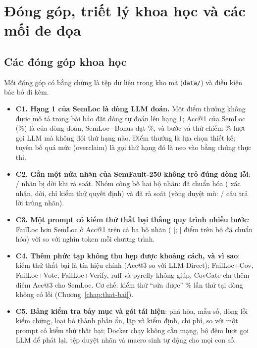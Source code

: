 \chapter{Đóng góp, triết lý khoa học và các mối đe dọa}
\label{chap:dong-gop}

\section{Các đóng góp khoa học}
\label{sec:dong-gop}

Mỗi đóng góp có bằng chứng là tệp dữ liệu trong kho mã (\texttt{data/}) và điều kiện bác bỏ đi kèm.
\begin{itemize}
\item \textbf{C1. Hạng 1 của SemLoc là dòng LLM đoán.} Một điểm thưởng không được mô tả trong bài báo đặt dòng tự đoán lên hạng
  1; Acc@1 của SemLoc (\RqTwoRepairedAllSemlocAccOneMean\%) là của dòng đoán, SemLoc−Bonus đạt
  \RqTwoRepairedAllSemlocNoPriorAccOneMean\%, và bước vá thử chiếm \CostCfSharePct\% lượt gọi LLM mà không đổi thứ hạng nào.
  Điểm thưởng là lựa chọn thiết kế; tuyên bố quá mức (overclaim) là gọi thứ hạng đó là neo vào bằng chứng thực thi.
\item \textbf{C2. Gần một nửa nhãn của SemFault-250 không trỏ đúng dòng lỗi}: \LabaudAllMoved{}/\LabaudAllN{} nhãn bị dời khi
  rà soát. Nhóm công bố hai bộ nhãn: đã chuẩn hóa (\GtConfirmedN{} xác nhận, \GtCorrectedN{} dời, chỉ kiểm thử quyết định)
  và đã rà soát (vòng duyệt mù: \BlindBlindAllMatchReviewed{}/\BlindBlindAllNReviewed{} câu trả lời trùng nhãn).
\item \textbf{C3. Một prompt có kiểm thử thất bại thắng quy trình nhiều bước}: FailLoc hơn SemLoc ở Acc@1 trên cả ba bộ nhãn
  (\RqTwoRepairedAllLlmTestsDAccOne{} [\RqTwoRepairedAllLlmTestsDAccOneLo; \RqTwoRepairedAllLlmTestsDAccOneHi] điểm trên
  bộ đã chuẩn hóa) với \CostLlmTestsTokensK{} so với \CostSemlocTokensK{} nghìn token mỗi chương trình.
\item \textbf{C4. Thêm phức tạp không thu hẹp được khoảng cách, và vì sao}: kiểm thử thất bại là tín hiệu chính (Acc@3
  \AblRepairedAllTestsEffectDAccThree{} so với LLM-Direct); FailLoc+Cov, FailLoc+Vote, FailLoc+Verify, ruff và pyrefly
  không giúp, CovGate chỉ thêm \RqTwoRepairedAllCovgateDAccThree{} điểm Acc@3 cho SemLoc. Cơ chế: kiểm thử ``sửa được''
  \PavmechReviewedOtherLineFixable\% lần thử tại dòng không có lỗi (Chương~\ref{chap:that-bai}).
\item \textbf{C5. Bảng kiểm tra bảy mục và gói tái hiện}: phá hòa, mẫu số, dòng lỗi kiểm chứng, loại bỏ thành phần ẩn, lặp và
  kiểm định, chi phí, so với một prompt có kiểm thử thất bại; Docker chạy không cần mạng, bộ đệm lượt gọi LLM để phát lại,
  tệp duyệt nhãn và macro sinh tự động cho mọi con số.
\end{itemize}

